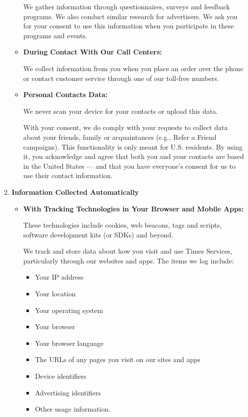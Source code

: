 \begin{enumerate}
\begin{itemize}
    We gather information through questionnaires, surveys and feedback
    programs. We also conduct similar research for advertisers. We ask
    you for your consent to use this information when you participate in
    these programs and events.
  \item
    \textbf{During Contact With Our Call Centers:}

    We collect information from you when you place an order over the
    phone or contact customer service through one of our toll-free
    numbers.
  \item
    \textbf{Personal Contacts Data:}

    We never scan your device for your contacts or upload this data.

    With your consent, we do comply with your requests to collect data
    about your friends, family or acquaintances (e.g., Refer a Friend
    campaigns). This functionality is only meant for U.S. residents. By
    using it, you acknowledge and agree that both you and your contacts
    are based in the United States --- and that you have everyone's
    consent for us to use their contact information.
  \end{itemize}
\item
  \textbf{Information Collected Automatically}

  \begin{itemize}
  \item
    \textbf{With Tracking Technologies in Your Browser and Mobile Apps:}

    These technologies include cookies, web beacons, tags and scripts,
    software development kits (or SDKs) and beyond.

    We track and store data about how you visit and use Times Services,
    particularly through our websites and apps. The items we log
    include:

    \begin{itemize}
    \tightlist
    \item
      Your IP address
    \item
      Your location
    \item
      Your operating system
    \item
      Your browser
    \item
      Your browser language
    \item
      The URLs of any pages you visit on our sites and apps
    \item
      Device identifiers
    \item
      Advertising identifiers
    \item
      Other usage information.
    \end{itemize}


\end{itemize}
\end{enumerate}
